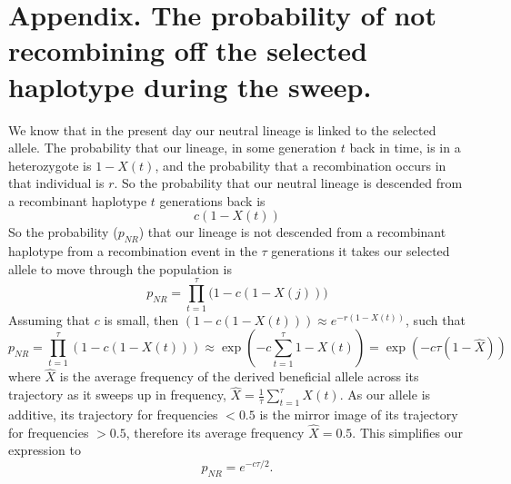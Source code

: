 \section{Appendix. The probability of not recombining off the selected
  haplotype during the sweep.} \label{Appendix:no_recom_sweep}

We know that in the present day our neutral lineage is linked to
the selected allele. The probability that our lineage, in some
generation $t$ back in time, is in a heterozygote is $1-X(t)$, and the
probability that a recombination occurs in that individual is $r$. So
the probability that our neutral lineage is descended from a
recombinant haplotype $t$ generations back is 
\begin{equation}
c (1-X(t))
\end{equation}
So the probability ($p_{NR}$) that our lineage is not descended from a
recombinant haplotype 
from a recombination event in the
$\tau$ generations it takes our selected allele to move through the
population is
\begin{equation}
p_{NR}=\prod_{t=1}^{\tau} \big(1- c(1-X(j))\big)
\end{equation}
Assuming that $c$ is small, then $ \left(1- c(1-X(t))\right) \approx
e^{-r(1-X(t))}$,  such that
\begin{equation}
p_{NR}=\prod_{t=1}^{\tau} \left(1- c(1-X(t))\right) \approx \exp
\left( -c\sum_{t=1}^{\tau}
1- X(t) \right) =\exp
\left( -c \tau (1-\widehat{X}) \right)
\end{equation}
where
$\widehat{X}$ is the average frequency of the derived beneficial allele across its trajectory as it sweeps up in frequency,
$\widehat{X} = \frac{1}{\tau}  \sum_{t=1}^{\tau}
 X(t)$. As our allele is additive, its trajectory for frequencies
 $<0.5$ is the mirror image of its trajectory for frequencies $>0.5$, therefore its
average frequency $\widehat{X} =0.5$. This simplifies our expression to
\begin{equation}
p_{NR} = e^{-c \tau/2 }.
\end{equation}



